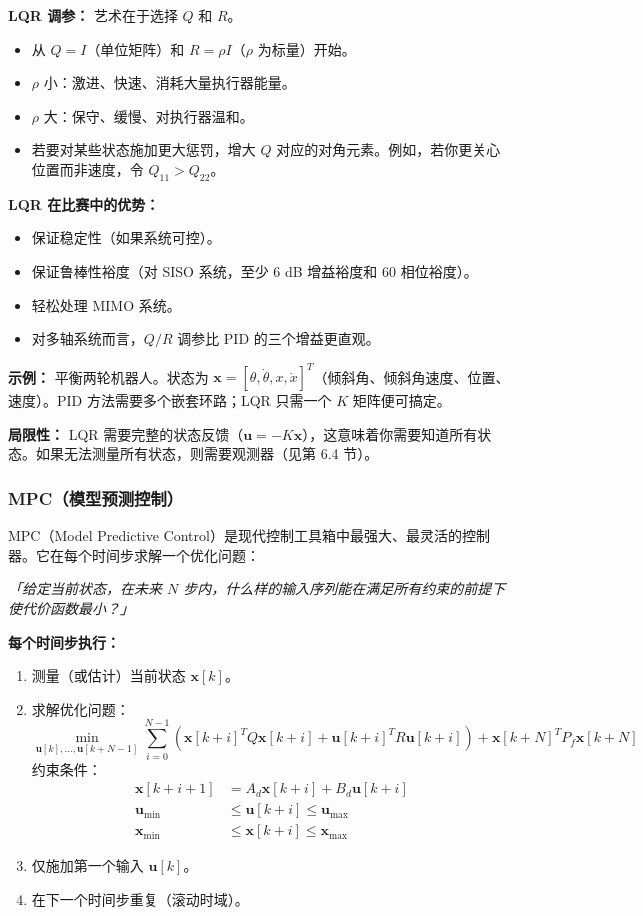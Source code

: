 \textbf{LQR 调参：} 艺术在于选择 $Q$ 和 $R$。
\begin{itemize}
    \item 从 $Q = I$（单位矩阵）和 $R = \rho I$（$\rho$ 为标量）开始。
    \item $\rho$ 小：激进、快速、消耗大量执行器能量。
    \item $\rho$ 大：保守、缓慢、对执行器温和。
    \item 若要对某些状态施加更大惩罚，增大 $Q$ 对应的对角元素。例如，若你更关心位置而非速度，令 $Q_{11} > Q_{22}$。
\end{itemize}

\textbf{LQR 在比赛中的优势：}
\begin{itemize}
    \item 保证稳定性（如果系统可控）。
    \item 保证鲁棒性裕度（对 SISO 系统，至少 6 dB 增益裕度和 60\textdegree{} 相位裕度）。
    \item 轻松处理 MIMO 系统。
    \item 对多轴系统而言，$Q/R$ 调参比 PID 的三个增益更直观。
\end{itemize}

\textbf{示例：} 平衡两轮机器人。状态为 $\mathbf{x} = [\theta, \dot{\theta}, x, \dot{x}]^T$（倾斜角、倾斜角速度、位置、速度）。PID 方法需要多个嵌套环路；LQR 只需一个 $K$ 矩阵便可搞定。

\textbf{局限性：} LQR 需要完整的状态反馈（$\mathbf{u} = -K\mathbf{x}$），这意味着你需要知道所有状态。如果无法测量所有状态，则需要观测器（见第 6.4 节）。

\subsubsection{MPC（模型预测控制）}

MPC（Model Predictive Control）是现代控制工具箱中最强大、最灵活的控制器。它在每个时间步求解一个优化问题：

\textit{「给定当前状态，在未来 $N$ 步内，什么样的输入序列能在满足所有约束的前提下使代价函数最小？」}

\textbf{每个时间步执行：}
\begin{enumerate}
    \item 测量（或估计）当前状态 $\mathbf{x}[k]$。
    \item 求解优化问题：
    \begin{equation}
    \min_{\mathbf{u}[k], \ldots, \mathbf{u}[k+N-1]} \sum_{i=0}^{N-1} \left( \mathbf{x}[k+i]^T Q \mathbf{x}[k+i] + \mathbf{u}[k+i]^T R \mathbf{u}[k+i] \right) + \mathbf{x}[k+N]^T P_f \mathbf{x}[k+N]
    \end{equation}
    约束条件：
    \begin{align}
    \mathbf{x}[k+i+1] &= A_d \mathbf{x}[k+i] + B_d \mathbf{u}[k+i] \\
    \mathbf{u}_{\min} &\leq \mathbf{u}[k+i] \leq \mathbf{u}_{\max} \\
    \mathbf{x}_{\min} &\leq \mathbf{x}[k+i] \leq \mathbf{x}_{\max}
    \end{align}
    \item 仅施加第一个输入 $\mathbf{u}[k]$。
    \item 在下一个时间步重复（滚动时域）。
\end{enumerate}

